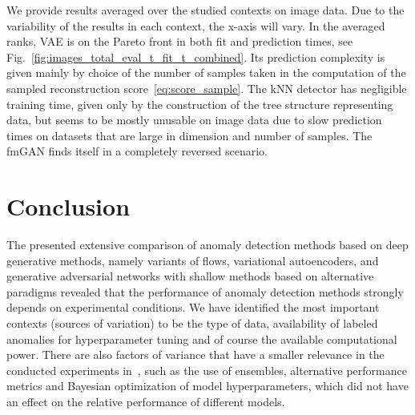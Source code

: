 We provide results averaged over the studied contexts on image data. Due to the variability of the results in each context, the x-axis will vary. In the averaged ranks, VAE is on the Pareto front in both fit and prediction times, see Fig.~\ref{fig:images_total_eval_t_fit_t_combined}. Its prediction complexity is given mainly by choice of the number of samples taken in the computation of the sampled reconstruction score~\eqref{eq:score_sample}. The kNN detector has negligible training time, given only by the construction of the tree structure representing data, but seems to be mostly unusable on image data due to slow prediction times on datasets that are large in dimension and number of samples. The fmGAN finds itself in a completely reversed scenario.

\section{Conclusion}
The presented extensive comparison of anomaly detection methods based on deep generative methods, namely variants of flows, variational autoencoders, and generative adversarial networks with shallow methods based on alternative paradigms revealed that the performance of anomaly detection methods strongly depends on experimental conditions. We have identified the most important contexts (sources of variation) to be the type of data, availability of labeled anomalies for hyperparameter tuning and of course the available computational power. There are also factors of variance that have a smaller relevance in the conducted experiments in~\cite{vskvara2021comparison}, such as the use of ensembles, alternative performance metrics and Bayesian optimization of model hyperparameters, which did not have an effect on the relative performance of different models.

